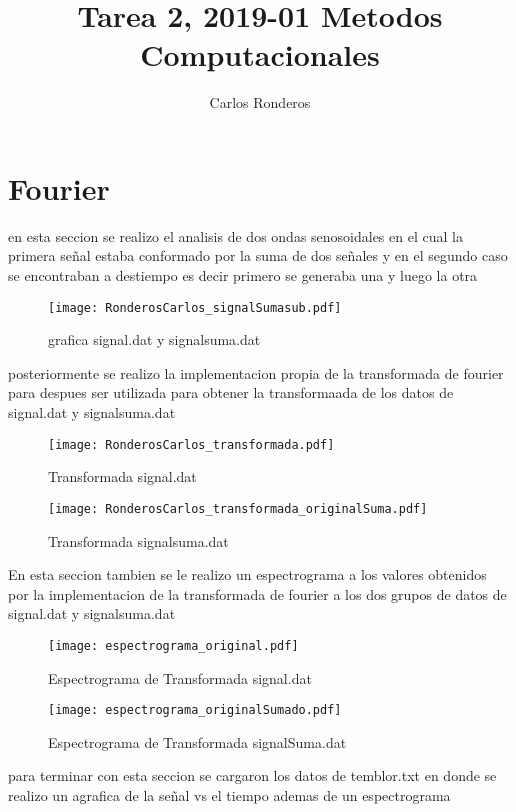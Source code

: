 \documentclass[12pt]{article}
\author{Carlos Ronderos}
\title{Tarea 2, 2019-01 Metodos Computacionales}
\begin{document}
\maketitle

\section{Fourier}
en esta seccion se realizo el analisis de dos ondas senosoidales en el cual la primera señal estaba conformado por la suma de dos señales y en el segundo caso se encontraban a destiempo es decir primero se generaba una y luego la otra

\begin{figure}[h!]
\centering
\texttt{[image: RonderosCarlos\_signalSumasub.pdf]}
\caption{grafica signal.dat y signalsuma.dat}
\label{Fig.}
\end{figure}

posteriormente se realizo la implementacion propia de la transformada de fourier para despues ser utilizada para obtener la transformaada de los datos de signal.dat y signalsuma.dat

\begin{figure}[h!]
\centering
\texttt{[image: RonderosCarlos\_transformada.pdf]}
\caption{Transformada signal.dat }
\label{Fig.}
\end{figure}

\begin{figure}[h!]
\centering
\texttt{[image: RonderosCarlos\_transformada\_originalSuma.pdf]}
\caption{Transformada signalsuma.dat }
\label{Fig.}
\end{figure}

En esta seccion tambien se le realizo un espectrograma a los valores obtenidos por la implementacion de la transformada de fourier a los dos grupos de datos de signal.dat y signalsuma.dat

\begin{figure}[h!]
\centering
\texttt{[image: espectrograma\_original.pdf]}
\caption{Espectrograma de Transformada signal.dat }
\label{Fig.}
\end{figure}

\begin{figure}[h!]
\centering
\texttt{[image: espectrograma\_originalSumado.pdf]}
\caption{Espectrograma de Transformada signalSuma.dat }
\label{Fig.}
\end{figure}

para terminar con esta seccion se cargaron los datos de temblor.txt en donde se realizo un agrafica de la señal vs el tiempo ademas de un espectrograma 
\end{document}
